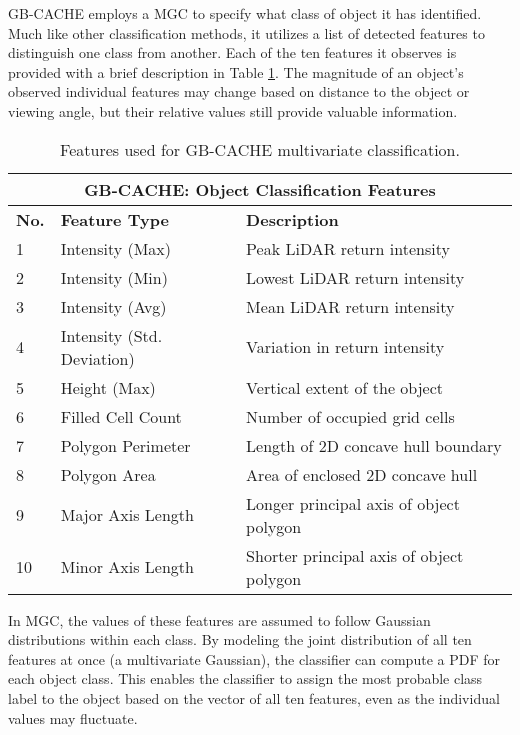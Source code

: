 \documentclass[../main.tex]{subfiles}
\begin{document}
GB-CACHE employs a \acl{MGC} to specify what class of object it has identified. 
Much like other classification methods, it utilizes a list of detected features to distinguish one class from another.
Each of the ten features it observes is provided with a brief description in Table \ref{tab:gbcache_features}.
The magnitude of an object's observed individual features may change based on distance to the object or viewing angle, but their relative values still provide valuable information.

\begin{table}[htbp]
\centering
\begin{tabular}{lll}
\hline
\multicolumn{3}{c}{GB-CACHE: Object Classification Features}\\
\hline
\hline
\textbf{No.} & \textbf{Feature Type} & \textbf{Description} \\ 
\hline
1 & Intensity (Max) & Peak LiDAR return intensity \\
2 & Intensity (Min) & Lowest LiDAR return intensity \\
3 & Intensity (Avg) & Mean LiDAR return intensity \\
4 & Intensity (Std. Deviation) & Variation in return intensity \\
5 & Height (Max) & Vertical extent of the object \\
6 & Filled Cell Count & Number of occupied grid cells \\
7 & Polygon Perimeter & Length of 2D concave hull boundary \\
8 & Polygon Area & Area of enclosed 2D concave hull \\
9 & Major Axis Length & Longer principal axis of object polygon \\
10 & Minor Axis Length & Shorter principal axis of object polygon \\
\hline
\end{tabular}
\caption{Features used for GB-CACHE multivariate classification.}
\label{tab:gbcache_features}
\end{table}

In \ac{MGC}, the values of these features are assumed to follow Gaussian distributions within each class.
By modeling the joint distribution of all ten features at once (a multivariate Gaussian), the classifier can compute a \acl{PDF} for each object class.
This enables the classifier to assign the most probable class label to the object based on the vector of all ten features, even as the individual values may fluctuate.
\end{document}
